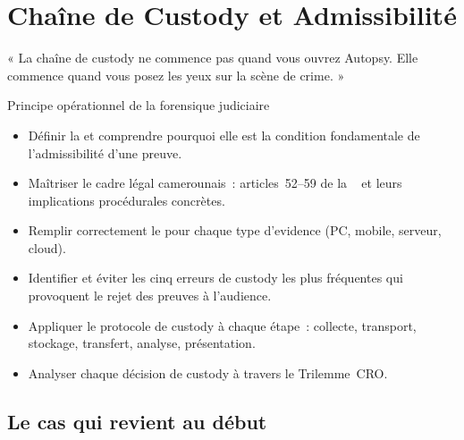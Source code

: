 
\chapter{Chaîne de Custody et Admissibilité}
\label{chap:custody}

\epigraph{%
    « La chaîne de custody ne commence pas quand vous ouvrez Autopsy.
    Elle commence quand vous posez les yeux sur la scène de crime. »%
}{Principe opérationnel de la forensique judiciaire}


\begin{boxobjectifs}
\begin{itemize}
    \item Définir la  et comprendre pourquoi
          elle est la condition fondamentale de l'admissibilité d'une preuve.
    \item Maîtriser le cadre légal camerounais~: articles~52--59 de la
          ~\cite{cameroun2010a} et leurs implications procédurales concrètes.
    \item Remplir correctement le 
          pour chaque type d'evidence (PC, mobile, serveur, cloud).
    \item Identifier et éviter les cinq erreurs de custody les plus
          fréquentes qui provoquent le rejet des preuves à l'audience.
    \item Appliquer le protocole de custody à chaque étape~:
          collecte, transport, stockage, transfert, analyse, présentation.
    \item Analyser chaque décision de custody à travers le Trilemme~CRO.
\end{itemize}
\end{boxobjectifs}

\bigskip

\section*{Le cas qui revient au début}

